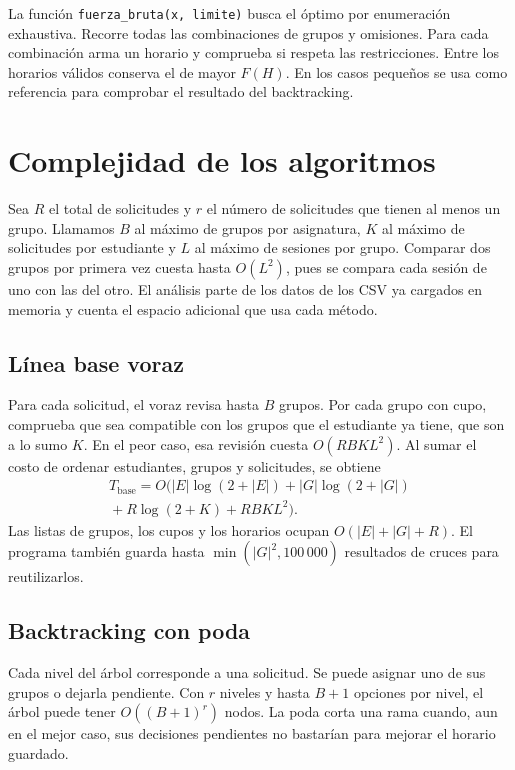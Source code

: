 \documentclass[11pt]{article}
\numberwithin{equation}{section}
\numberwithin{figure}{section}
\numberwithin{table}{section}
\theoremstyle{definition}
\begin{document}
La función \texttt{fuerza\_bruta(x, limite)} busca el óptimo por
enumeración exhaustiva. Recorre todas las combinaciones de grupos y
omisiones. Para cada combinación arma un horario y comprueba si
respeta las restricciones. Entre los horarios válidos conserva el
de mayor \(F(H)\). En los casos pequeños se usa como referencia para
comprobar el resultado del backtracking.

\section{Complejidad de los algoritmos}
\label{sec:complejidad-algoritmos}

Sea \(R\) el total de solicitudes y \(r\) el número de solicitudes que
tienen al menos un grupo. Llamamos \(B\) al máximo de grupos por
asignatura, \(K\) al máximo de solicitudes por estudiante y \(L\) al
máximo de sesiones por grupo. Comparar dos grupos por primera vez
cuesta hasta \(O(L^2)\), pues se compara cada sesión de uno con las del
otro. El análisis parte de los datos de los CSV ya cargados en memoria
y cuenta el espacio adicional que usa cada método.

\subsection{Línea base voraz}

Para cada solicitud, el voraz revisa hasta \(B\) grupos. Por cada grupo
con cupo, comprueba que sea compatible con los grupos que el estudiante
ya tiene, que son a lo sumo \(K\). En el peor caso, esa revisión cuesta
\(O(RBKL^2)\). Al sumar el costo de ordenar estudiantes, grupos y
solicitudes, se obtiene
\begin{multline*}
 T_{\mathrm{base}} = O\bigl(|E|\log(2+|E|)+|G|\log(2+|G|)\\
                          {}+ R\log(2+K)+RBKL^2\bigr).
\end{multline*}
Las listas de grupos, los cupos y los horarios ocupan
\(O(|E|+|G|+R)\). El programa también guarda hasta
\(\min(|G|^2,100\,000)\) resultados de cruces para reutilizarlos.

\subsection{Backtracking con poda}

Cada nivel del árbol corresponde a una solicitud. Se puede asignar
uno de sus grupos o dejarla pendiente. Con \(r\) niveles y hasta
\(B+1\) opciones por nivel, el árbol puede tener \(O((B+1)^r)\) nodos.
La poda corta una rama cuando, aun en el mejor caso, sus decisiones
pendientes no bastarían para mejorar el horario guardado.
\end{document}
